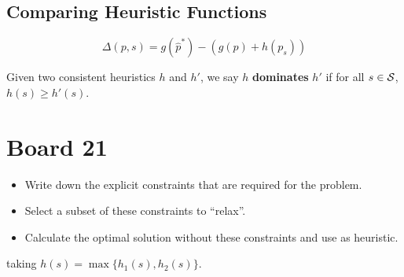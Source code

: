 \documentclass[10pt]{article}
\begin{document}
\subsection{Comparing Heuristic Functions}

\[\Delta(p, s) = g(\hat{p}^*) - (g(p) + h(p_s)) \] 

\begin{defn}
  Given two consistent heuristics $h$ and $h'$, we say $h$ \textbf{dominates} $h'$ if 
  for all $s\in\mathcal{S}$, $h(s) \geq h'(s)$. 
\end{defn}

\section{Board 21}

\begin{itemize}
\item Write down the explicit constraints that are required for the problem. 
\item Select a subset of these constraints to ``relax''.
\item Calculate the optimal solution without these constraints and use as heuristic.   
\end{itemize}




taking $h(s) = \max\{ h_1(s), h_2(s)\}$.

\end{document}
